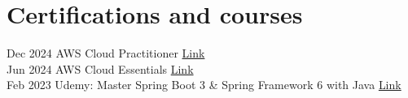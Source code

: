 \documentclass[letterpaper]{twentysecondcv} %
\begin{document}
\vspace{6mm}

\section{Certifications and courses}
\begin{twenty} %
	\twentyitem
    		{Dec 2024}
		{}
        		{AWS Cloud Practitioner}
        		{\href{https://www.credly.com/badges/5ec185ac-c564-4941-b258-3169c7152ae7}{Link}}
        		{}
        		{}\\
	\twentyitem
    		{Jun 2024}
		{}
        		{AWS Cloud Essentials}
        		{\href{https://link.springer.com/chapter/10.1007/978-3-662-54577-5_27}{Link}}
        		{}
        		{}\\
        	\twentyitem
    		{Feb 2023}
		{}
        		{Udemy: Master Spring Boot 3 \& Spring Framework 6 with Java}
        		{\href{https://www.udemy.com/certificate/UC-1aac444c-0cd8-485f-8480-8e6c3bfbb18a/}{Link}}
        		{}
        		{}
\end{twenty}

\vspace{6mm}

\end{document}
